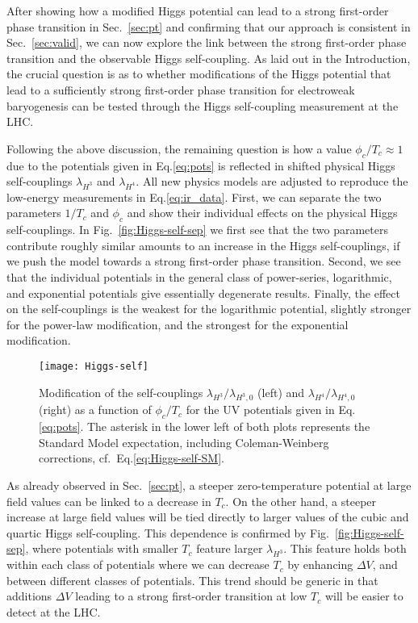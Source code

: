 \documentclass[aps,prd,11pt,tightenlines,superscriptaddress,nofootinbib,preprintnumbers,notitlepage]{revtex4-1}
\begin{document}
After showing how a modified Higgs potential can lead to a strong
first-order phase transition in Sec.~\ref{sec:pt} and confirming that
our approach is consistent in Sec.~\ref{sec:valid}, we can now explore
the link between the strong first-order phase transition and the
observable Higgs self-coupling. As laid out in the Introduction, the
crucial question is as to whether modifications of the Higgs potential that
lead to a sufficiently strong first-order phase transition for
electroweak baryogenesis can be tested through the Higgs self-coupling
measurement at the LHC.\medskip

Following the above discussion, the remaining question is how a value
$\phi_c/T_c \approx 1$ due to the potentials given in
Eq.\eqref{eq:pots} is reflected in shifted physical Higgs
self-couplings $\lambda_{H^3}$ and $\lambda_{H^4}$. All new physics
models are adjusted to reproduce the low-energy measurements in
Eq.\eqref{eq:ir_data}.  First, we can separate the two parameters
$1/T_c$ and $\phi_c$ and show their individual effects on the physical
Higgs self-couplings.  In Fig.~\ref{fig:Higgs-self-sep} we first see
that the two parameters contribute roughly similar amounts to an
increase in the Higgs self-couplings, if we push the model towards a
strong first-order phase transition. Second, we see that the
individual potentials in the general class of power-series,
logarithmic, and exponential potentials give essentially degenerate
results. Finally, the effect on the self-couplings is the weakest for
the logarithmic potential, slightly stronger for the power-law
modification, and the strongest for the exponential
modification.

\begin{figure}[!t]
 \texttt{[image: Higgs-self]}
 \caption{Modification of the self-couplings
   $\lambda_{H^3}/\lambda_{H^3,0}$ (left) and
   $\lambda_{H^4}/\lambda_{H^4,0}$ (right) as a function of
   $\phi_c/T_c$ for the UV potentials given in Eq.\eqref{eq:pots}.
   The asterisk in the lower left of both plots represents the 
   Standard Model expectation, including Coleman-Weinberg corrections, 
   cf.~Eq.\eqref{eq:Higgs-self-SM}.
   }
 \label{fig:Higgs-self}
\end{figure}

As already observed in Sec.~\ref{sec:pt}, a steeper zero-temperature
potential at large field values can be linked to a decrease in
$T_c$. On the other hand, a steeper increase at large field values
will be tied directly to larger values of the cubic and quartic Higgs
self-coupling. This dependence is confirmed by
Fig.~\ref{fig:Higgs-self-sep}, where potentials with smaller $T_c$
feature larger $\lambda_{H^3}$. This feature holds both within each
class of potentials where we can decrease $T_c$ by enhancing $\Delta
V$, and between different classes of potentials. This trend should be
generic in that additions $\Delta V$ leading to a strong first-order
transition at low $T_c$ will be easier to detect at the LHC.\medskip
\end{document}
